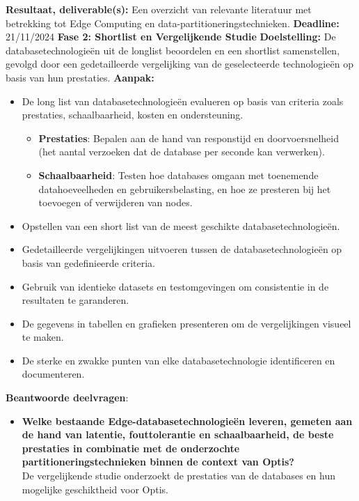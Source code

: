     \textbf{Resultaat, deliverable(s):} Een overzicht van relevante literatuur met betrekking tot Edge Computing en data-partitioneringstechnieken.\newline\newline
    \textbf{Deadline:} 21/11/2024\newline\newline
\textbf{Fase 2: Shortlist en Vergelijkende Studie}\newline\newline
    \textbf{Doelstelling:} De databasetechnologieën uit de longlist beoordelen en een shortlist samenstellen, gevolgd door een gedetailleerde vergelijking van de geselecteerde technologieën op basis van hun prestaties.\newline\newline
    \textbf{Aanpak:}
    \begin{itemize}
        \item De long list van databasetechnologieën evalueren op basis van criteria zoals prestaties, schaalbaarheid, kosten en ondersteuning.
        \begin{itemize}
          \item \textbf{Prestaties}: Bepalen aan de hand van responstijd en doorvoersnelheid (het aantal verzoeken dat de database per seconde kan verwerken).
          \item \textbf{Schaalbaarheid}: Testen hoe databases omgaan met toenemende datahoeveelheden en gebruikersbelasting, en hoe ze presteren bij het toevoegen of verwijderen van nodes.
        \end{itemize}
        \item Opstellen van een short list van de meest geschikte databasetechnologieën.
        \item Gedetailleerde vergelijkingen uitvoeren tussen de databasetechnologieën op basis van gedefinieerde criteria.

        \item Gebruik van identieke datasets en testomgevingen om consistentie in de resultaten te garanderen.
        \item De gegevens in tabellen en grafieken presenteren om de vergelijkingen visueel te maken.
        \item De sterke en zwakke punten van elke databasetechnologie identificeren en documenteren.
    \end{itemize}
    \textbf{Beantwoorde deelvragen}:
    \begin{itemize}
    \item \textbf{Welke bestaande Edge-databasetechnologieën leveren, gemeten aan de hand van latentie, fouttolerantie en schaalbaarheid, de beste prestaties in combinatie met de onderzochte partitioneringstechnieken binnen de context van Optis?} \\
      De vergelijkende studie onderzoekt de prestaties van de databases en hun mogelijke geschiktheid voor Optis.
    \end{itemize}
